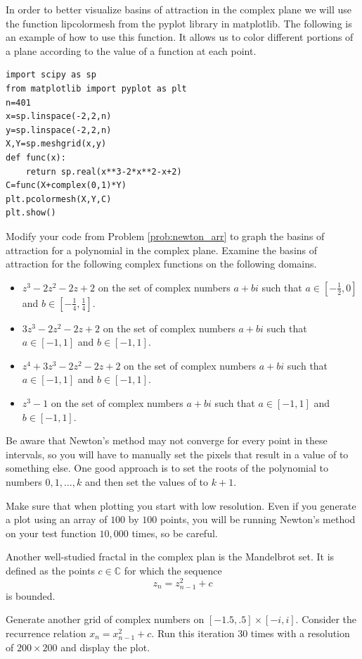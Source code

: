 In order to better visualize basins of attraction in the complex plane we will use the function li{pcolormesh} from the pyplot library in matplotlib.
The following is an example of how to use this function.
It allows us to color different portions of a plane according to the value of a function at each point.

\begin{lstlisting}
import scipy as sp
from matplotlib import pyplot as plt
n=401
x=sp.linspace(-2,2,n)
y=sp.linspace(-2,2,n)
X,Y=sp.meshgrid(x,y)
def func(x):
    return sp.real(x**3-2*x**2-x+2)
C=func(X+complex(0,1)*Y)
plt.pcolormesh(X,Y,C)
plt.show()
\end{lstlisting}

\begin{problem}
Modify your code from Problem \ref{prob:newton_arr} to graph the basins of attraction for a polynomial in the complex plane.
Examine the basins of attraction for the following complex functions on the following domains.
\begin{itemize}

\item $z^3 - 2 z^2 - 2 z + 2$ on the set of complex numbers $a + b i$ such that $a \in \left[-\frac{1}{2}, 0\right]$ and $b \in \left[-\frac{1}{4}, \frac{1}{4}\right]$.

\item $3 z^3 - 2 z^2 - 2 z + 2$ on the set of complex numbers $a + b i$ such that $a \in \left[-1, 1\right]$ and $b \in \left[-1, 1\right]$.

\item $z^4 + 3 z^3 - 2 z^2 - 2 z + 2$ on the set of complex numbers $a + b i$ such that $a \in \left[-1, 1\right]$ and $b \in \left[-1, 1\right]$.

\item $z^3 - 1$ on the set of complex numbers $a + b i$ such that $a \in \left[-1, 1\right]$ and $b \in \left[-1, 1\right]$.

\end{itemize}
Be aware that Newton's method may not converge for every point in these intervals, so you will have to manually set the pixels that result in a value of  to something else.
One good approach is to set the roots of the polynomial to numbers $0, 1, \dots, k$ and then set the values of  to $k+1$.

Make sure that when plotting you start with low resolution.
Even if you generate a plot using an array of $100$ by $100$ points, you will be running Newton's method on your test function $10,000$ times, so be careful.
\end{problem}

Another well-studied fractal in the complex plan is the Mandelbrot set.
It is defined as the points $c \in \mathbb{C}$ for which the sequence
\[z_n = z_{n-1}^2 + c\]
is bounded.

\begin{problem}
Generate another grid of complex numbers on $[-1.5,.5]\times[-i,i]$.
Consider the recurrence relation $x_n = x_{n-1}^2 + c$.
Run this iteration 30 times with a resolution of $200 \times 200$ and display the plot.
\end{problem}
